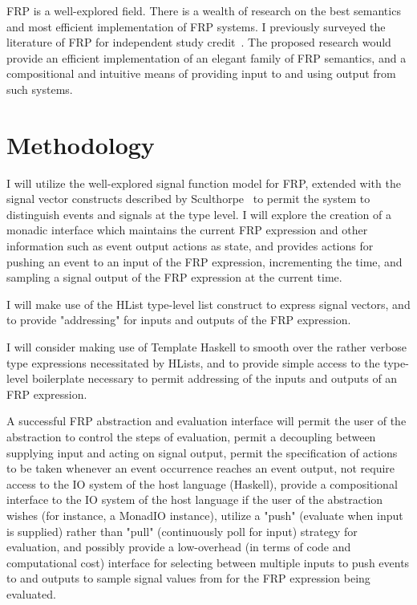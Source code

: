 \documentclass[11pt]{artikel3}
\begin{document}
FRP is a well-explored field. There is a wealth of research on the best semantics and most efficient implementation of FRP systems. I previously surveyed
the literature of FRP for independent study credit~\cite{Amsden2011}. The proposed research would provide an efficient implementation of an elegant family of FRP semantics,
and a compositional and intuitive means of providing input to and using output from such systems.

\section{Methodology}
\label{sec:methodology}

I will utilize the well-explored signal function model for FRP, extended with the signal vector constructs described by Sculthorpe~\cite{Sculthorpe2011} to permit the system to distinguish events
and signals at the type level. I will explore the creation of a monadic interface which maintains the current FRP expression and other information such as event output actions as state, and provides
actions for pushing an event to an input of the FRP expression, incrementing the time, and sampling a signal output of the FRP expression at the current time. 

I will make use of the HList type-level list construct to express signal vectors, and to provide "addressing" for inputs and outputs of the FRP expression. 

I will consider making use of Template Haskell to smooth over the rather verbose type expressions necessitated by HLists, and to provide simple access to the type-level boilerplate necessary to permit addressing of the inputs and outputs of an FRP expression.

A successful FRP abstraction and evaluation interface will permit the user of the abstraction to control the steps of evaluation, permit a decoupling between supplying input and acting on signal output, permit the specification of actions to be taken whenever an event occurrence reaches an event output, not require access to the IO system of the host language (Haskell), provide a compositional interface to the IO system of the host language if the user of the abstraction wishes (for instance, a MonadIO instance), utilize a "push" (evaluate when input is supplied) rather than "pull" (continuously poll for input) strategy for evaluation, and possibly provide a low-overhead (in terms of code and computational cost) interface for selecting between multiple inputs to push events to and outputs to sample signal values from for the FRP expression being evaluated.
\end{document}
